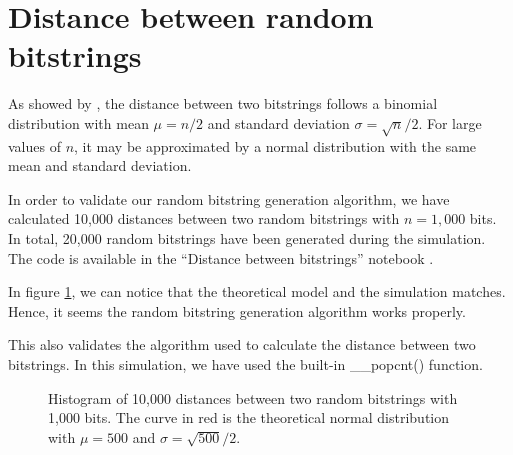 \section{Distance between random bitstrings}

As showed by \citet{Kanerva1988}, the distance between two bitstrings follows a binomial distribution with mean $\mu = n/2$ and standard deviation $\sigma = \sqrt{n}/2$. For large values of $n$, it may be approximated by a normal distribution with the same mean and standard deviation.

In order to validate our random bitstring generation algorithm, we have calculated 10,000 distances between two random bitstrings with $n=1,000$ bits. In total, 20,000 random bitstrings have been generated during the simulation. The code is available in the ``Distance between bitstrings'' notebook \citep{sdmframework}.

In figure \ref{fig:validation-distance}, we can notice that the theoretical model and the simulation matches. Hence, it seems the random bitstring generation algorithm works properly.

This also validates the algorithm used to calculate the distance between two bitstrings. In this simulation, we have used the built-in \_\_popcnt() function.

\begin{figure}[!htb]
  \centering

  \caption{Histogram of 10,000 distances between two random bitstrings with 1,000 bits. The curve in red is the theoretical normal distribution with $\mu = 500$ and $\sigma = \sqrt{500}/2$.}
  \label{fig:validation-distance}
\end{figure}


